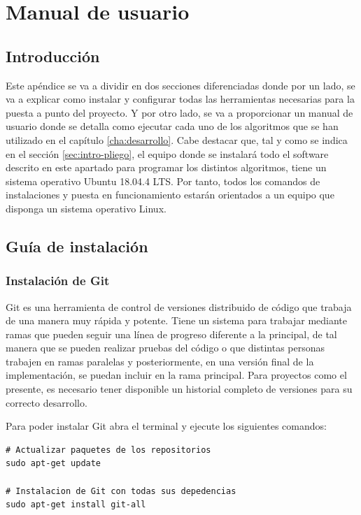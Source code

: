 
\chapter{Manual de usuario}
\label{cha:manual-usuario}

\section{Introducción}
\label{sec:intro-manual-de-usuario}

Este apéndice se va a dividir en dos secciones diferenciadas donde por un lado, se va a explicar como instalar y configurar todas las herramientas necesarias para la puesta a punto del proyecto. Y por otro lado, se va a proporcionar un manual de usuario donde se detalla como ejecutar cada uno de los algoritmos que se han utilizado en el capítulo \ref{cha:desarrollo}.
Cabe destacar que, tal y como se indica en el sección \ref{sec:intro-pliego}, el equipo donde se instalará todo el software descrito en este apartado para programar los distintos algoritmos, tiene un sistema operativo Ubuntu 18.04.4 LTS. Por tanto, todos los comandos de instalaciones y puesta en funcionamiento estarán orientados a un equipo que disponga un sistema operativo Linux.

\section{Guía de instalación}
\label{sec:sec-guia-instalacion}

\subsection{Instalación de Git}
\label{subsec:instalacion-git}

Git es una herramienta de control de versiones distribuido de código que trabaja de una manera muy rápida y potente. Tiene un sistema para trabajar mediante ramas que pueden seguir una línea de progreso diferente a la principal, de tal manera que se pueden realizar pruebas del código o que distintas personas trabajen en ramas paralelas y posteriormente, en una versión final de la implementación, se puedan incluir en la rama principal. Para proyectos como el presente, es necesario tener disponible un historial completo de versiones para su correcto desarrollo.

Para poder instalar Git abra el terminal y ejecute los siguientes comandos:

\vspace{0.5cm}
\begin{lstlisting}[language=iPython,caption=Instalación de Git,captionpos=b,label={lst:install-git}]
# Actualizar paquetes de los repositorios
sudo apt-get update

# Instalacion de Git con todas sus depedencias
sudo apt-get install git-all
\end{lstlisting}

